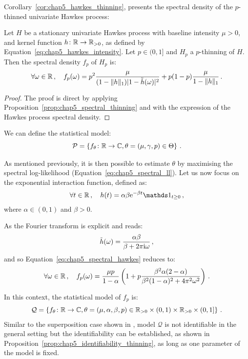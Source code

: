     Corollary~\ref{cor:chap5_hawkes_thinning}, presents the spectral density of the $p$-thinned univariate Hawkes process:

    \begin{corollary}\label{cor:chap5_hawkes_thinning}
        Let $H$ be a stationary univariate Hawkes process with baseline intensity $\mu > 0$, and kernel function $h\colon {\mathbb R}\to {\mathbb R}_{>0}$,
        as defined by Equation~\eqref{eq:chap5_hawkes_intensity}. Let $p\in(0,1]$ and $H_p$ a $p$-thinning of $H$. 
        Then the spectral density $f_p$ of $H_p$ is:
        \begin{equation}\label{eq:chap5_spectral_hawkes}
            \forall \omega \in {\mathbb R}\,, \quad f_p(\omega) = p^2 \frac{\mu}{(1-\|h\|_1)|1-\tilde h(\omega)|^2} + p(1-p)\frac{\mu}{1-\|h\|_1}\,.
        \end{equation}
    \end{corollary}
    \begin{proof}
        The proof is direct by applying Proposition~\ref{prop:chap5_spectral_thinning} and 
        with the expression of the Hawkes process spectral density.
    \end{proof}
    We can define the statistical model:
    \[\mathcal{P} = 
      \left\{
        f_\theta \colon {\mathbb R} \to {\mathbb C}, \theta = (\mu, \gamma, p) \in \Theta
      \right\}\,.
    \]

    As mentioned previously, it is then possible to estimate $\theta$ by maximising the spectral log-likelihood (Equation~\eqref{eq:chap5_spectral_ll}).
    Let us now focus on the exponential interaction function, defined as:
    \[\forall t\in\RR\,,\quad h(t) = \alpha \beta \mathrm{e}^{-\beta t}\II_{t\geq 0}\,,\]
    where $\alpha \in(0,1)$ and $\beta > 0$.

    As the Fourier transform is explicit and reads:
    \[\tilde h (\omega) = \frac{\alpha \beta}{\beta + 2 \pi \mathrm{i} \omega}\,,\]
    and so Equation~\eqref{eq:chap5_spectral_hawkes} reduces to:
    \begin{equation}\label{eq:chap5_spectral_exponential}
        \forall \omega\in{\mathbb R}\,,\quad
        f_p(\omega) = \frac{\mu p }{1-\alpha}\left(1 + p \frac{\beta^2 \alpha (2-\alpha)}{\beta^2(1-\alpha)^2 + 4 \pi^2 \omega^2}\right)\,.
    \end{equation}

    In this context, the statistical model of $f_p$ is:
    \[\mathcal{Q} = 
      \left\{
        f_\theta \colon {\mathbb R} \to {\mathbb C}, 
        \theta = (\mu, \alpha, \beta, p) \in {\mathbb R}_{>0}\times (0,1) \times {\mathbb R}_{>0}\times(0,1]
      \right\}\,.
    \]
    Similar to the superposition case shown in \textcite[Proposition 3.2]{Bonnet2024}, 
    model $\mathcal{Q}$ is not identifiable in the general setting but the identifiability can be established, as shown in Proposition~\ref{prop:chap5_identifiability_thinning}, as long as one parameter of the model is fixed.

